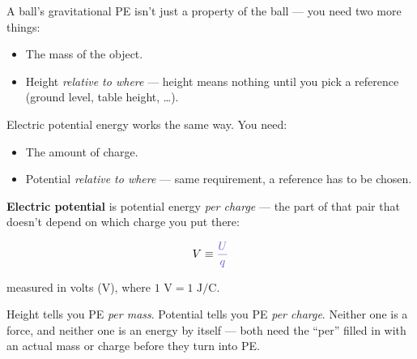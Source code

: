 \documentclass[12pt]{article}
\newcommand{\ANS}[1]{\textcolor{accent}{#1}}
\begin{document}



A ball's gravitational PE isn't just a property of the ball --- you need two
more things:

\begin{itemize}[itemsep=6pt,parsep=3pt,topsep=3pt]
\item \ANS{The mass of the object.}
\item \ANS{Height \emph{relative to where}} --- height means nothing until
you pick a reference (ground level, table height, \dots).
\end{itemize}

Electric potential energy works the same way. You need:

\begin{itemize}[itemsep=6pt,parsep=3pt,topsep=3pt]
\item \ANS{The amount of charge.}
\item \ANS{Potential \emph{relative to where}} --- same requirement, a
reference has to be chosen.
\end{itemize}

\textbf{Electric potential} is potential energy \emph{per charge} --- the
part of that pair that doesn't depend on which charge you put there:

\[
V \equiv \ANS{\dfrac{U}{q}}
\]

measured in \ANS{volts (V)}, where \ANS{$1\text{ V} = 1\text{ J/C}$}.

{\small\color{accent} Height tells you PE \emph{per mass}. Potential tells
you PE \emph{per charge}. Neither one is a force, and neither one is an
energy by itself --- both need the ``per'' filled in with an actual mass or
charge before they turn into PE.}
\end{document}
